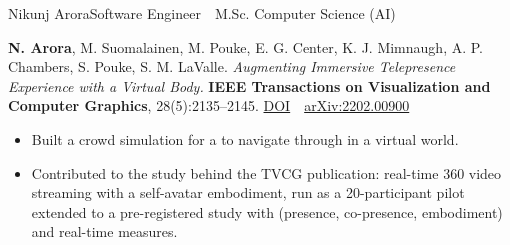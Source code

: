 \documentclass{article}
\begin{document}
\begin{cv}[avatar]{Nikunj Arora}{Software Engineer \,\textbullet\, M.Sc. Computer Science (AI)}

\begin{cvevent}[2022]
    \textbf{N. Arora}, M. Suomalainen, M. Pouke, E. G. Center, K. J. Mimnaugh, A. P. Chambers, S. Pouke, S. M. LaValle. \emph{Augmenting Immersive Telepresence Experience with a Virtual Body.} \textbf{IEEE Transactions on Visualization and Computer Graphics}, 28(5):2135--2145. \href{https://doi.org/10.1109/TVCG.2022.3150473}{DOI} \,\textbullet\, \href{https://arxiv.org/abs/2202.00900}{arXiv:2202.00900}
\end{cvevent}



\begin{cvevent}[2020]
    \begin{itemize}
        \item Built a  crowd simulation for a  to navigate through in a virtual world.
        \item Contributed to the  study behind the TVCG publication: real-time 360\textdegree{} video streaming with a self-avatar embodiment, run as a 20-participant pilot extended to a pre-registered  study with  (presence, co-presence, embodiment) and real-time  measures.
    \end{itemize}
\end{cvevent}

\newpage


\newcommand{\qtbA}{\item Automated \cvhl{Android Automotive} \cvhl{AOSP} image builds via a build server, enabling fast image creation for internal use and client delivery.}
\newcommand{\qtbB}{\item Used \cvhl{Android} hidden APIs to enable activity-embedding beyond the public SDK, unlocking custom \cvhl{IVI} UI patterns.}
\newcommand{\qtbC}{\item Implemented the \cvhl{Media Sessions API} for \cvhl{Qt for Android Automotive}, enabling media playback control on an \cvhl{IVI}.}
\newcommand{\qtbD}{\item Created and maintain the \cvhl{Qt for Android Studio} plugin, letting developers embed \cvhl{QML} in native Android apps without leaving the IDE.}
\newcommand{\qtbE}{\item Maintain the companion \cvhl{Qt Gradle plugin} that automates \cvhl{QML} builds inside \cvhl{Android Studio}, removing hand-configured build steps.}
\newcommand{\qtbF}{\item Authored \cvhl{Claude}-compatible \cvhl{LLM} skills for \cvhl{Qt for VSCode} to guide new developers through onboarding, cutting time-to-first-build.}


\end{cv}
\end{document}
